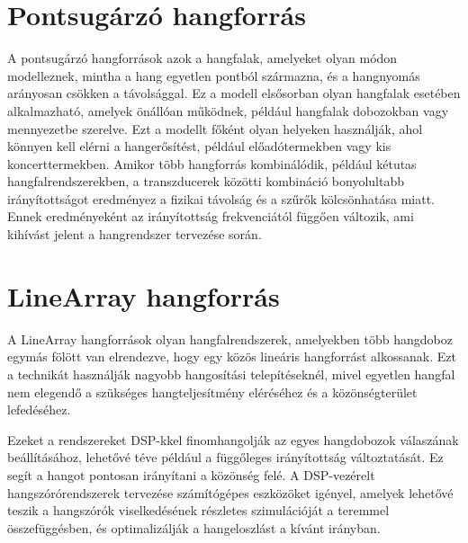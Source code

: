 \section{Pontsugárzó hangforrás}

A pontsugárzó hangforrások azok a hangfalak, amelyeket olyan módon modelleznek, mintha a hang egyetlen pontból származna, és a hangnyomás arányosan csökken a távolsággal. 
Ez a modell elsősorban olyan hangfalak esetében alkalmazható, amelyek önállóan működnek, például hangfalak dobozokban vagy mennyezetbe szerelve. 
Ezt a modellt főként olyan helyeken használják, ahol könnyen kell elérni a hangerősítést, például előadótermekben vagy kis koncerttermekben. 
Amikor több hangforrás kombinálódik, például kétutas hangfalrendszerekben, a transzducerek közötti kombináció bonyolultabb irányítottságot eredményez
a fizikai távolság és a szűrők kölcsönhatása miatt. 
Ennek eredményeként az irányítottság frekvenciától függően változik, ami kihívást jelent a hangrendszer tervezése során.

\section{LineArray hangforrás}

A LineArray hangforrások olyan hangfalrendszerek, amelyekben több hangdoboz egymás fölött van elrendezve, 
hogy egy közös lineáris hangforrást alkossanak. Ezt a technikát használják nagyobb hangosítási telepítéseknél, 
mivel egyetlen hangfal nem elegendő a szükséges hangteljesítmény eléréséhez és a közönségterület lefedéséhez. 








Ezeket a rendszereket DSP-kkel finomhangolják az egyes hangdobozok válaszának beállításához, lehetővé téve például
a függőleges irányítottság változtatását. Ez segít a hangot pontosan irányítani a közönség felé. 
A DSP-vezérelt hangszórórendszerek tervezése számítógépes eszközöket igényel, 
amelyek lehetővé teszik a hangszórók viselkedésének részletes szimulációját a teremmel összefüggésben, 
és optimalizálják a hangeloszlást a kívánt irányban.


